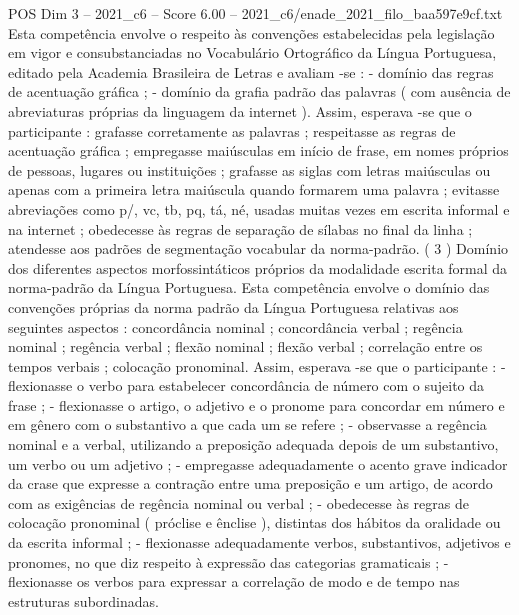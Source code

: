 \begin{textsample}{POS Dim 3 – 2021\_c6 – Score 6.00 – 2021\_c6/enade\_2021\_filo\_baa597e9cf.txt}
Esta competência envolve o respeito às convenções estabelecidas pela legislação em vigor e consubstanciadas no Vocabulário Ortográfico da Língua Portuguesa, editado pela Academia Brasileira de Letras e avaliam -se : - domínio das regras de acentuação gráfica ; - domínio da grafia padrão das palavras ( com ausência de abreviaturas próprias da linguagem da internet ).
Assim, esperava -se que o participante : grafasse corretamente as palavras ; respeitasse as regras de acentuação gráfica ; empregasse maiúsculas em início de frase, em nomes próprios de pessoas, lugares ou instituições ; grafasse as siglas com letras maiúsculas ou apenas com a primeira letra maiúscula quando formarem uma palavra ; evitasse abreviações como p/, vc, tb, pq, tá, né, usadas muitas vezes em escrita informal e na internet ; obedecesse às regras de separação de sílabas no final da linha ; atendesse aos padrões de segmentação vocabular da norma-padrão. ( 3 ) Domínio dos diferentes aspectos morfossintáticos próprios da modalidade escrita formal da norma-padrão da Língua Portuguesa.
Esta competência envolve o domínio das convenções próprias da norma padrão da Língua Portuguesa relativas aos seguintes aspectos : concordância nominal ; concordância verbal ; regência nominal ; regência verbal ; flexão nominal ; flexão verbal ; correlação entre os tempos verbais ; colocação pronominal.
Assim, esperava -se que o participante : - flexionasse o verbo para estabelecer concordância de número com o sujeito da frase ; - flexionasse o artigo, o adjetivo e o pronome para concordar em número e em gênero com o substantivo a que cada um se refere ; - observasse a regência nominal e a verbal, utilizando a preposição adequada depois de um substantivo, um verbo ou um adjetivo ; - empregasse adequadamente o acento grave indicador da crase que expresse a contração entre uma preposição e um artigo, de acordo com as exigências de regência nominal ou verbal ; - obedecesse às regras de colocação pronominal ( próclise e ênclise ), distintas dos hábitos da oralidade ou da escrita informal ; - flexionasse adequadamente verbos, substantivos, adjetivos e pronomes, no que diz respeito à expressão das categorias gramaticais ; - flexionasse os verbos para expressar a correlação de modo e de tempo nas estruturas subordinadas.

\end{textsample}
